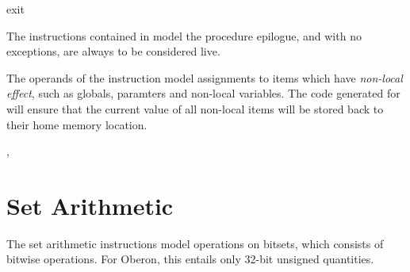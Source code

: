 \begin{instruction}{exit}

  \begin{notes}
    The instructions contained in  model the procedure
    epilogue, and with no exceptions, are always to be considered
    live.

    The operands of the  instruction model assignments
    to items which have \emph{non-local effect}, such as globals,
    \byref paramters and non-local variables.  The code generated for
     will ensure that the current value of all non-local
    items will be stored back to their home memory location.
  \end{notes}

  \nresults


  \begin{seealso}
    , 
  \end{seealso}
\end{instruction}


\section{Set Arithmetic}\label{class:set-arithmetic}

The set arithmetic instructions model operations on bitsets, which
consists of bitwise operations.  For Oberon, this entails only 32-bit
unsigned quantities.

